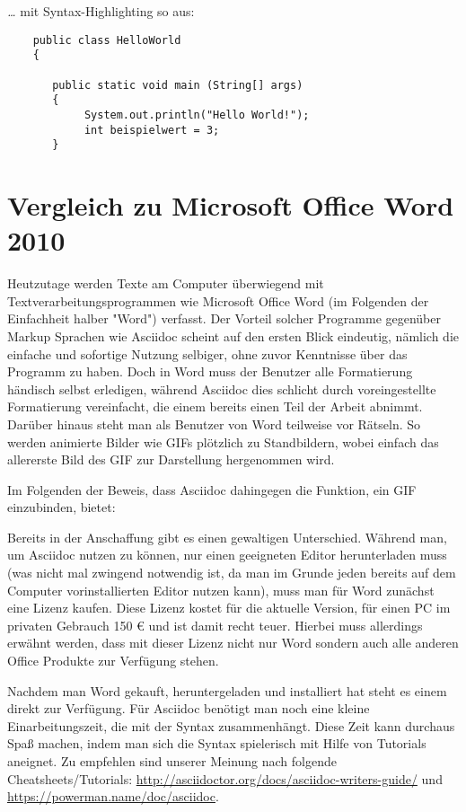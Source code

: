 \documentclass[11pt]{amsbook}
\begin{document}
\emph{…​} mit Syntax-Highlighting so aus:


\begin{verbatim}
    public class HelloWorld
    {

       public static void main (String[] args)
       {
            System.out.println("Hello World!");
            int beispielwert = 3;
       }
\end{verbatim}

\hypertarget{x-vergleich-zu-microsoft-office-word-2010}{\chapter*{Vergleich zu Microsoft Office Word 2010}}
Heutzutage werden Texte am Computer überwiegend mit Textverarbeitungsprogrammen wie Microsoft Office Word (im Folgenden der Einfachheit halber "Word") verfasst. Der Vorteil solcher Programme gegenüber Markup Sprachen wie Asciidoc scheint auf den ersten Blick eindeutig, nämlich die einfache und sofortige Nutzung selbiger, ohne zuvor Kenntnisse über das Programm zu haben. Doch in Word muss der Benutzer alle Formatierung händisch selbst erledigen, während Asciidoc dies schlicht durch voreingestellte Formatierung vereinfacht, die einem bereits einen Teil der Arbeit abnimmt. Darüber hinaus steht man als Benutzer von Word teilweise vor Rätseln. So werden animierte Bilder wie GIFs plötzlich zu Standbildern, wobei einfach das allererste Bild des GIF zur Darstellung hergenommen wird.


Im Folgenden der Beweis, dass Asciidoc dahingegen die Funktion, ein GIF einzubinden, bietet:





Bereits in der Anschaffung gibt es einen gewaltigen Unterschied. Während man, um Asciidoc nutzen zu können, nur einen geeigneten Editor herunterladen muss (was nicht mal zwingend notwendig ist, da man im Grunde jeden bereits auf dem Computer vorinstallierten Editor nutzen kann), muss man für Word zunächst eine Lizenz kaufen. Diese Lizenz kostet für die aktuelle Version, für einen PC im privaten Gebrauch 150 € und ist damit recht teuer. Hierbei muss allerdings erwähnt werden, dass mit dieser Lizenz nicht nur Word sondern auch alle anderen Office Produkte zur Verfügung stehen.


Nachdem man Word gekauft, heruntergeladen und installiert hat steht es einem direkt zur Verfügung. Für Asciidoc benötigt man noch eine kleine Einarbeitungszeit, die mit der Syntax zusammenhängt. Diese Zeit kann durchaus Spaß machen, indem man sich die Syntax spielerisch mit Hilfe von Tutorials aneignet. Zu empfehlen sind unserer Meinung nach folgende Cheatsheets/Tutorials: \href{http://asciidoctor.org/docs/asciidoc-writers-guide/}{http://asciidoctor.org/docs/asciidoc-writers-guide/} und \href{https://powerman.name/doc/asciidoc}{https://powerman.name/doc/asciidoc}.
\end{document}
